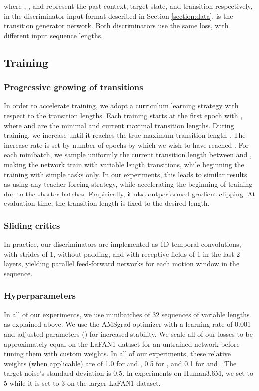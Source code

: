 \documentclass[acmtog]{acmart}
\begin{document}
where , , and  represent the past context, target state, and transition respectively, in the discriminator input format described in Section \ref{section:data}.  is the transition generator network. Both discriminators use the same loss, with different input sequence lengths. 



\subsection{Training}

\subsubsection{Progressive growing of transitions}
In order to accelerate training, we adopt a curriculum learning strategy with respect to the transition lengths. Each training starts at the first epoch with , where  and  are the minimal and current maximal transition lengths. During training, we increase  until it reaches the true maximum transition length . The increase rate is set by number of epochs  by which we wish to have reached . For each minibatch, we sample uniformly the current transition length between  and , making the network train with variable length transitions, while beginning the training with simple tasks only. In our experiments, this leads to similar results as using any teacher forcing strategy, while accelerating the beginning of training due to the shorter batches. Empirically, it also outperformed gradient clipping. At evaluation time, the transition length is fixed to the desired length.

\subsubsection{Sliding critics}
In practice, our discriminators are implemented as 1D temporal convolutions, with strides of 1, without padding, and with receptive fields of 1 in the last 2 layers, yielding parallel feed-forward networks for each motion window in the sequence.

\subsubsection{Hyperparameters} In all of our experiments, we use minibatches of 32 sequences of variable lengths as explained above. We use the AMSgrad optimizer \cite{sashank2018amsgrad} with a learning rate of 0.001 and adjusted parameters () for increased stability. We scale all of our losses to be approximately equal on the LaFAN1 dataset for an untrained network before tuning them with custom weights. In all of our experiments, these relative weights (when applicable) are of 1.0 for  and , 0.5 for , and 0.1 for  and . The target noise's standard deviation  is 0.5. In experiments on Human3.6M, we set  to 5 while it is set to 3 on the larger LaFAN1 dataset. 
\end{document}
